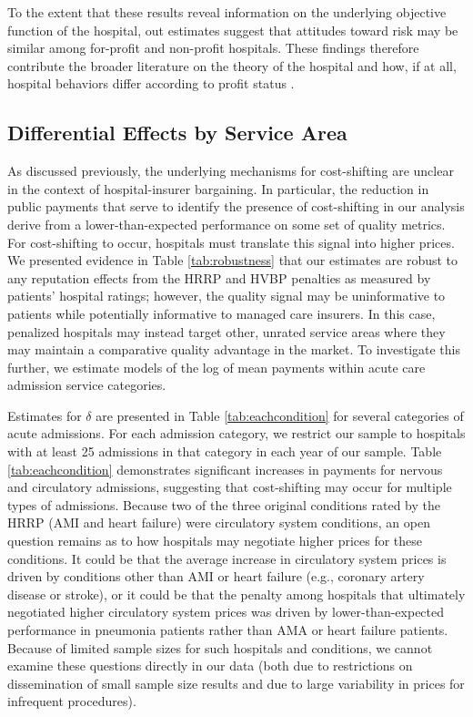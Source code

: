 \documentclass[12pt]{article}
\begin{document}
To the extent that these results reveal information on the underlying objective function of the hospital, out estimates suggest that attitudes toward risk may be similar among for-profit and non-profit hospitals. These findings therefore contribute the broader literature on the theory of the hospital and how, if at all, hospital behaviors differ according to profit status \citep{sloan2001,duggan2002,horwitz2005,horwitz2009,david2009}.

\subsection{Differential Effects by Service Area}
As discussed previously, the underlying mechanisms for cost-shifting are unclear in the context of hospital-insurer bargaining. In particular, the reduction in public payments that serve to identify the presence of cost-shifting in our analysis derive from a lower-than-expected performance on some set of quality metrics. For cost-shifting to occur, hospitals must translate this signal into higher prices. We presented evidence in Table \ref{tab:robustness} that our estimates are robust to any reputation effects from the HRRP and HVBP penalties as measured by patients' hospital ratings; however, the quality signal may be uninformative to patients while potentially informative to managed care insurers. In this case, penalized hospitals may instead target other, unrated service areas where they may maintain a comparative quality advantage in the market. To investigate this further, we estimate models of the log of mean payments within acute care admission service categories.

Estimates for $\delta$ are presented in Table \ref{tab:eachcondition} for several categories of acute admissions. For each admission category, we restrict our sample to hospitals with at least 25 admissions in that category in each year of our sample. Table \ref{tab:eachcondition} demonstrates significant increases in payments for nervous and circulatory admissions, suggesting that cost-shifting may occur for multiple types of admissions. Because two of the three original conditions rated by the HRRP (AMI and heart failure) were circulatory system conditions, an open question remains as to how hospitals may negotiate higher prices for these conditions. It could be that the average increase in circulatory system prices is driven by conditions other than AMI or heart failure (e.g., coronary artery disease or stroke), or it could be that the penalty among hospitals that ultimately negotiated higher circulatory system prices was driven by lower-than-expected performance in pneumonia patients rather than AMA or heart failure patients. Because of limited sample sizes for such hospitals and conditions, we cannot examine these questions directly in our data (both due to restrictions on dissemination of small sample size results and due to large variability in prices for infrequent procedures).
\end{document}
